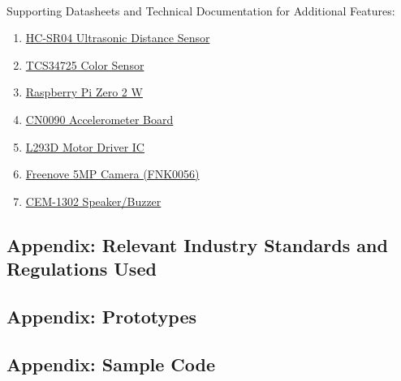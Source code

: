 \documentclass{article}
\begin{document}
\

Supporting Datasheets and Technical Documentation for Additional Features:
\begin{enumerate}
    \item \href{https://cdn.sparkfun.com/datasheets/Sensors/Proximity/HCSR04.pdf}{HC-SR04 Ultrasonic Distance Sensor}
    \item \href{https://cdn-shop.adafruit.com/datasheets/TCS34725.pdf}{TCS34725 Color Sensor}
    \item \href{https://datasheets.raspberrypi.com/rpizero2/raspberry-pi-zero-2-w-product-brief.pdf}{Raspberry Pi Zero 2 W}
    \item \href{https://mm.digikey.com/Volume0/opasdata/d220001/medias/docus/60/CN0090%20DATASHEET.pdf}{CN0090 Accelerometer Board}
    \item \href{https://www.st.com/content/ccc/resource/technical/document/datasheet/d3/84/d5/f6/3c/23/40/7b/CD00001883.pdf/files/CD00001883.pdf/jcr:content/translations/en.CD00001883.pdf}{L293D Motor Driver IC}
    \item \href{https://store.freenove.com/products/fnk0056}{Freenove 5MP Camera (FNK0056)}
    \item \href{https://www.sameskydevices.com/product/resource/cem-1203-42-.pdf?srsltid=AfmBOorbfJiXs7OIBQN95JLHokXYxTFx0Sd8qTPObMLqcfIHXVElk2uz}{CEM-1302 Speaker/Buzzer}
\end{enumerate}
\subsection{Appendix: Relevant Industry Standards and Regulations Used}

\subsection{Appendix: Prototypes}

\subsection{Appendix: Sample Code}
\end{document}
